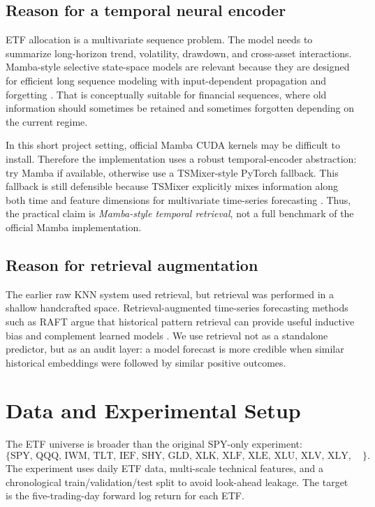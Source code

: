 \documentclass[11pt]{article}
\begin{document}
\subsection{Reason for a temporal neural encoder}
ETF allocation is a multivariate sequence problem. The model needs to summarize long-horizon trend, volatility, drawdown, and cross-asset interactions. Mamba-style selective state-space models are relevant because they are designed for efficient long sequence modeling with input-dependent propagation and forgetting \cite{gu2023mamba}. That is conceptually suitable for financial sequences, where old information should sometimes be retained and sometimes forgotten depending on the current regime.

In this short project setting, official Mamba CUDA kernels may be difficult to install. Therefore the implementation uses a robust temporal-encoder abstraction: try Mamba if available, otherwise use a TSMixer-style PyTorch fallback. This fallback is still defensible because TSMixer explicitly mixes information along both time and feature dimensions for multivariate time-series forecasting \cite{chen2023tsmixer}. Thus, the practical claim is \emph{Mamba-style temporal retrieval}, not a full benchmark of the official Mamba implementation.

\subsection{Reason for retrieval augmentation}
The earlier raw KNN system used retrieval, but retrieval was performed in a shallow handcrafted space. Retrieval-augmented time-series forecasting methods such as RAFT argue that historical pattern retrieval can provide useful inductive bias and complement learned models \cite{han2025raft}. We use retrieval not as a standalone predictor, but as an audit layer: a model forecast is more credible when similar historical embeddings were followed by similar positive outcomes.

\section{Data and Experimental Setup}
The ETF universe is broader than the original SPY-only experiment:
\[
\{\text{SPY, QQQ, IWM, TLT, IEF, SHY, GLD, XLK, XLF, XLE, XLU, XLV, XLY, XLP}\}.
\]
The experiment uses daily ETF data, multi-scale technical features, and a chronological train/validation/test split to avoid look-ahead leakage. The target is the five-trading-day forward log return for each ETF.
\end{document}
